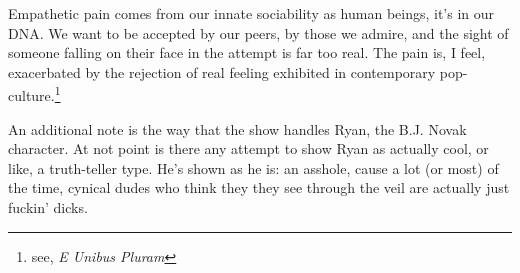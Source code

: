 \documentclass[../butidigress.tex]{subfiles}
\begin{document}
Empathetic pain comes from our innate sociability as human beings, it's in our DNA.
We want to be accepted by our peers, by those we admire, and the sight of someone falling on their face in the attempt is far too real.
The pain is, I feel, exacerbated by the rejection of real feeling exhibited in contemporary pop-culture.\footnote{see, \textit{E Unibus Pluram}}

An additional note is the way that the show handles Ryan, the B.J. Novak character.
At not point is there any attempt to show Ryan as actually cool, or like, a truth-teller type.
He's shown as he is: an asshole, cause a lot (or most) of the time, cynical dudes who think they they see through the veil are actually just fuckin' dicks.
\end{document}
